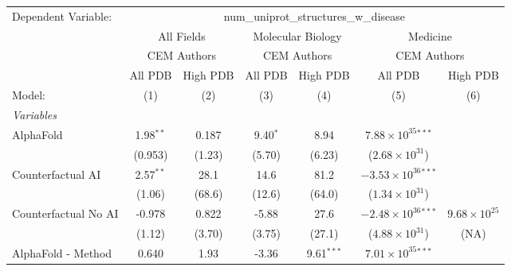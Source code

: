 \begingroup
\centering
\begin{tabular}{lcccccc}
   \tabularnewline \midrule \midrule
   Dependent Variable: & \multicolumn{6}{c}{num\_uniprot\_structures\_w\_disease}\\
 & \multicolumn{2}{c}{All Fields} & \multicolumn{2}{c}{Molecular Biology} & \multicolumn{2}{c}{Medicine} \\
\cmidrule(lr){2-3} \cmidrule(lr){4-5} \cmidrule(lr){6-7}
 & \multicolumn{2}{c}{CEM Authors} & \multicolumn{2}{c}{CEM Authors} & \multicolumn{2}{c}{CEM Authors} \\
\cmidrule(lr){2-3} \cmidrule(lr){4-5} \cmidrule(lr){6-7}
 & \multicolumn{1}{c}{All PDB} & \multicolumn{1}{c}{High PDB} & \multicolumn{1}{c}{All PDB} & \multicolumn{1}{c}{High PDB} & \multicolumn{1}{c}{All PDB} & \multicolumn{1}{c}{High PDB} \\
\cmidrule(lr){2-2} \cmidrule(lr){3-3} \cmidrule(lr){4-4} \cmidrule(lr){5-5} \cmidrule(lr){6-6} \cmidrule(lr){7-7}
   Model:                                                     & (1)         & (2)    & (3)          & (4)          & (5)                            & (6)\\  
   \midrule
   \emph{Variables}\\
   AlphaFold                                                  & 1.98$^{**}$ & 0.187  & 9.40$^{*}$   & 8.94         & $7.88\times 10^{35}$$^{***}$   &   \\   
                                                              & (0.953)     & (1.23) & (5.70)       & (6.23)       & ($2.68\times 10^{31}$)         &   \\   
   Counterfactual AI                                          & 2.57$^{**}$ & 28.1   & 14.6         & 81.2         & $-3.53\times 10^{36}$$^{***}$  &   \\   
                                                              & (1.06)      & (68.6) & (12.6)       & (64.0)       & ($1.34\times 10^{31}$)         &   \\   
   Counterfactual No AI                                       & -0.978      & 0.822  & -5.88        & 27.6         & $-2.48\times 10^{36}$$^{***}$  & $9.68\times 10^{25}$\\    
                                                              & (1.12)      & (3.70) & (3.75)       & (27.1)       & ($4.88\times 10^{31}$)         & (NA)\\   
   AlphaFold - Method                                         & 0.640       & 1.93   & -3.36        & 9.61$^{***}$ & $7.01\times 10^{35}$$^{***}$   &   \\   

\end{tabular}
